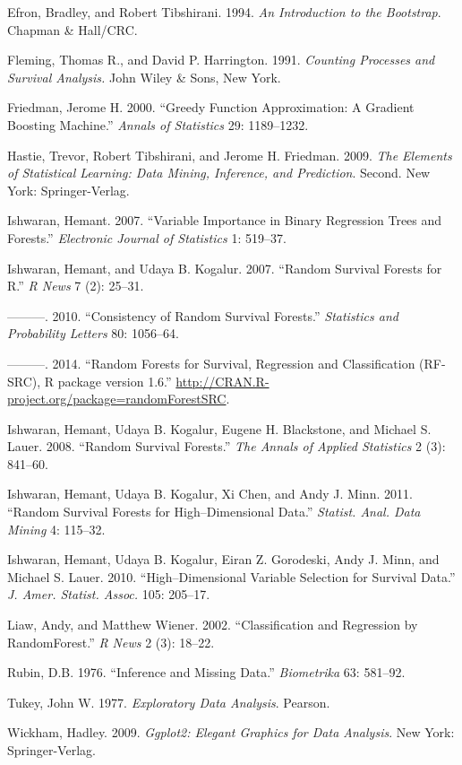 \documentclass[article]{jss}
\begin{document}
\hypertarget{ref-bootstrap:1994}{}
Efron, Bradley, and Robert Tibshirani. 1994. \emph{An Introduction to
the Bootstrap}. Chapman \& Hall/CRC.

\hypertarget{ref-fleming:1991}{}
Fleming, Thomas R., and David P. Harrington. 1991. \emph{Counting
Processes and Survival Analysis.} John Wiley \& Sons, New York.

\hypertarget{ref-Friedman:2000}{}
Friedman, Jerome H. 2000. ``Greedy Function Approximation: A Gradient
Boosting Machine.'' \emph{Annals of Statistics} 29: 1189--1232.

\hypertarget{ref-StatisticalLearning:2009}{}
Hastie, Trevor, Robert Tibshirani, and Jerome H. Friedman. 2009.
\emph{The Elements of Statistical Learning: Data Mining, Inference, and
Prediction}. Second. New York: Springer-Verlag.

\hypertarget{ref-Ishwaran:2007}{}
Ishwaran, Hemant. 2007. ``Variable Importance in Binary Regression Trees
and Forests.'' \emph{Electronic Journal of Statistics} 1: 519--37.

\hypertarget{ref-Ishwaran:2007a}{}
Ishwaran, Hemant, and Udaya B. Kogalur. 2007. ``Random Survival Forests
for R.'' \emph{R News} 7 (2): 25--31.

\hypertarget{ref-Ishwaran:2010a}{}
---------. 2010. ``Consistency of Random Survival Forests.''
\emph{Statistics and Probability Letters} 80: 1056--64.

\hypertarget{ref-Ishwaran:RFSRC:2014}{}
---------. 2014. ``Random Forests for Survival, Regression and
Classification (RF-SRC), R package version 1.6.''
\url{http://CRAN.R-project.org/package=randomForestSRC}.

\hypertarget{ref-Ishwaran:2008}{}
Ishwaran, Hemant, Udaya B. Kogalur, Eugene H. Blackstone, and Michael S.
Lauer. 2008. ``Random Survival Forests.'' \emph{The Annals of Applied
Statistics} 2 (3): 841--60.

\hypertarget{ref-Ishwaran:2011}{}
Ishwaran, Hemant, Udaya B. Kogalur, Xi Chen, and Andy J. Minn. 2011.
``Random Survival Forests for High--Dimensional Data.'' \emph{Statist.
Anal. Data Mining} 4: 115--32.

\hypertarget{ref-Ishwaran:2010}{}
Ishwaran, Hemant, Udaya B. Kogalur, Eiran Z. Gorodeski, Andy J. Minn,
and Michael S. Lauer. 2010. ``High--Dimensional Variable Selection for
Survival Data.'' \emph{J. Amer. Statist. Assoc.} 105: 205--17.

\hypertarget{ref-Liaw:2002}{}
Liaw, Andy, and Matthew Wiener. 2002. ``Classification and Regression by
RandomForest.'' \emph{R News} 2 (3): 18--22.

\hypertarget{ref-Rubin:1976}{}
Rubin, D.B. 1976. ``Inference and Missing Data.'' \emph{Biometrika} 63:
581--92.

\hypertarget{ref-Tukey:1977}{}
Tukey, John W. 1977. \emph{Exploratory Data Analysis}. Pearson.

\hypertarget{ref-Wickham:2009}{}
Wickham, Hadley. 2009. \emph{Ggplot2: Elegant Graphics for Data
Analysis}. New York: Springer-Verlag.
\end{document}
